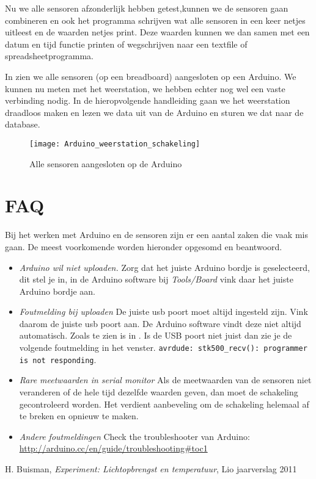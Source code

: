 Nu we alle sensoren afzonderlijk hebben getest,kunnen we de sensoren
gaan combineren en ook het programma schrijven wat alle sensoren in een
keer netjes uitleest en de waarden netjes print. Deze waarden kunnen we
dan samen met een datum en tijd functie printen of wegschrijven naar een
textfile of spreadsheetprogramma.

In  zien we alle sensoren (op
een breadboard) aangesloten op een Arduino. We kunnen nu meten met het weerstation, 
we hebben echter nog wel een vaste verbinding nodig. In de hieropvolgende 
handleiding gaan we het weerstation draadloos maken en lezen we data uit van 
de Arduino en sturen we dat naar de \hisparc database.




\begin{figure}
    \centering
    \texttt{[image: Arduino\_weerstation\_schakeling]}
    \caption{Alle sensoren aangesloten op de Arduino}
   \label{fig:Arduino_weerstation_schakeling}
\end{figure}


\section{FAQ}

Bij het werken met Arduino en de sensoren zijn er een aantal zaken die vaak mis
gaan. De meest voorkomende worden hieronder opgesomd en beantwoord.

\begin{itemize} 
    \item \emph{Arduino wil niet uploaden.} Zorg dat het
    juiste Arduino bordje is geselecteerd, dit stel je in, in de Arduino
    software bij \emph{Tools/Board} vink daar het juiste Arduino bordje aan.
    \item \emph{Foutmelding bij uploaden} De juiste usb poort moet altijd
    ingesteld zijn. Vink daarom de juiste usb poort aan. De Arduino software
    vindt deze niet altijd automatisch. Zoals te zien is in
    . Is de USB poort niet juist dan zie je de
    volgende foutmelding in het venster.
    \verb|avrdude: stk500_recv(): programmer is not responding|.
    \item \emph{Rare meetwaarden in serial
    monitor} Als de meetwaarden van de sensoren niet veranderen of de hele
    tijd dezelfde waarden geven, dan moet de schakeling gecontroleerd
    worden. Het verdient aanbeveling om de schakeling helemaal af te breken
    en opnieuw te maken.
    \item \emph{Andere foutmeldingen} Check the troubleshooter van Arduino: 
    \url{http://arduino.cc/en/guide/troubleshooting#toc1} 
    
\end{itemize}

\begin{thebibliography}{9}
        H. Buisman, \emph{\hisparc Experiment: Lichtopbrengst en temperatuur}, 
        Lio jaarverslag 2011
\end{thebibliography}



